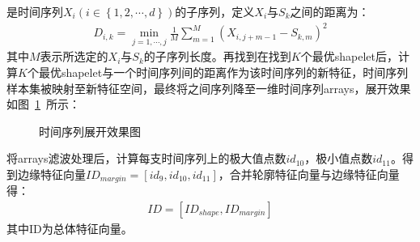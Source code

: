 \documentclass{whutmod}
\begin{document}
		是时间序列$X_{i}(i\in \left \{1,2,\cdots,d  \right \})$的子序列，定义$X_{i}$与$S_{k}$之间的距离为：
		\begin{gather}
		D _ { i , k } = \min _ { j = 1 , \cdots , j } \frac { 1 } { M } \sum _ { m = 1 } ^ { M } \left( X _ { i , j + m - 1 } - S _ { k , m } \right) ^ { 2 }
		\end{gather}
		其中$M$表示所选定的$X_{i}$与$S_{k}$的子序列长度。再找到在找到$K$个最优shapelet后，计算$K$个最优shapelet与一个时间序列间的距离作为该时间序列的新特征，时间序列样本集被映射至新特征空间，最终将之间序列降至一维时间序列arrays，展开效果如图~\ref{99}~所示：
					\begin{figure} [H]
			\centering 
			\quad
				\caption{时间序列展开效果图}\label{99}	
		\end{figure}

	
		将arrays滤波处理后，计算每支时间序列上的极大值点数$id_{10}$，极小值点数$id_{11}$。得到边缘特征向量$ID_{margin}=[id_{9},id_{10},id_{11}]$，合并轮廓特征向量与边缘特征向量得：
		\begin{gather}
		ID=[ID_{shape},ID_{margin}]
		\end{gather}
	     其中ID为总体特征向量。
\end{document}
